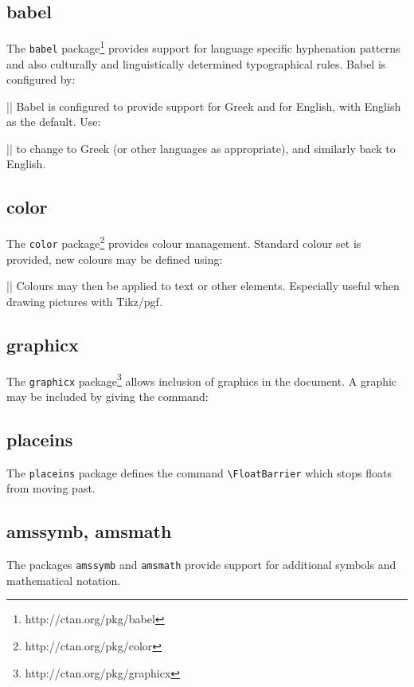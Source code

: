 \documentclass[electronic,timesopt]{adharticle} %
\begin{document}
\subsection{babel}

The \texttt{babel} package\footnote{http://ctan.org/pkg/babel} provides support
for language specific hyphenation patterns and also culturally and
linguistically determined typographical rules. Babel is configured by:

\latex||
Babel is configured to provide support for Greek and for English, with English
as the default. Use:

\latex||
to change to Greek (or other languages as appropriate), and similarly back to
English.

\subsection{color}

The \texttt{color} package\footnote{http://ctan.org/pkg/color} provides colour
management. Standard colour set is provided, new colours may be defined using:

\latex||
Colours may then be applied to text or other elements. Especially useful when
drawing pictures with Tikz/pgf.

\subsection{graphicx}

The \texttt{graphicx} package\footnote{http://ctan.org/pkg/graphicx} allows
inclusion of graphics in the document. A graphic may be included by giving the
command:

\subsection{placeins}

The \texttt{placeins} package defines the command
\texttt{\textbackslash{}FloatBarrier} which stops floats from moving past.

\subsection{amssymb, amsmath}

The packages \texttt{amssymb} and \texttt{amsmath} provide support for
additional symbols and mathematical notation.
\end{document}
